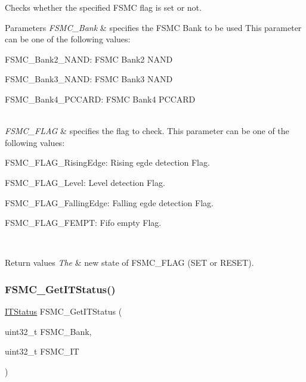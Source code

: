 Checks whether the specified F\+S\+MC flag is set or not. 


\begin{DoxyParams}{Parameters}
{\em F\+S\+M\+C\+\_\+\+Bank} & specifies the F\+S\+MC Bank to be used This parameter can be one of the following values\+: \begin{DoxyItemize}
\item F\+S\+M\+C\+\_\+\+Bank2\+\_\+\+N\+A\+ND\+: F\+S\+MC Bank2 N\+A\+ND \item F\+S\+M\+C\+\_\+\+Bank3\+\_\+\+N\+A\+ND\+: F\+S\+MC Bank3 N\+A\+ND \item F\+S\+M\+C\+\_\+\+Bank4\+\_\+\+P\+C\+C\+A\+RD\+: F\+S\+MC Bank4 P\+C\+C\+A\+RD \end{DoxyItemize}
\\
\hline
{\em F\+S\+M\+C\+\_\+\+F\+L\+AG} & specifies the flag to check. This parameter can be one of the following values\+: \begin{DoxyItemize}
\item F\+S\+M\+C\+\_\+\+F\+L\+A\+G\+\_\+\+Rising\+Edge\+: Rising egde detection Flag. \item F\+S\+M\+C\+\_\+\+F\+L\+A\+G\+\_\+\+Level\+: Level detection Flag. \item F\+S\+M\+C\+\_\+\+F\+L\+A\+G\+\_\+\+Falling\+Edge\+: Falling egde detection Flag. \item F\+S\+M\+C\+\_\+\+F\+L\+A\+G\+\_\+\+F\+E\+M\+PT\+: Fifo empty Flag. \end{DoxyItemize}
\\
\hline
\end{DoxyParams}

\begin{DoxyRetVals}{Return values}
{\em The} & new state of F\+S\+M\+C\+\_\+\+F\+L\+AG (S\+ET or R\+E\+S\+ET). \\
\hline
\end{DoxyRetVals}
\mbox{\label{group___f_s_m_c___private___functions_ga7fce9ca889d33cd8b8b7413875dd4d73}} 
\subsubsection{\texorpdfstring{FSMC\_GetITStatus()}{FSMC\_GetITStatus()}}
{\footnotesize\ttfamily \mbox{\hyperlink{group___exported__types_gaacbd7ed539db0aacd973a0f6eca34074}{I\+T\+Status}} F\+S\+M\+C\+\_\+\+Get\+I\+T\+Status (\begin{DoxyParamCaption}\item[{uint32\+\_\+t}]{F\+S\+M\+C\+\_\+\+Bank,  }\item[{uint32\+\_\+t}]{F\+S\+M\+C\+\_\+\+IT }\end{DoxyParamCaption})}



